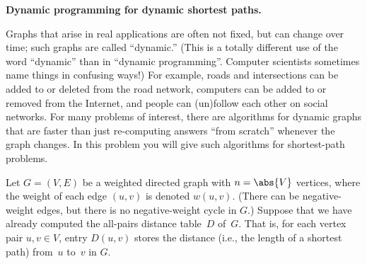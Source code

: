 \documentclass[11pt,addpoints]{exam}
\begin{document}
\begin{questions}

  
  \question \textbf{Dynamic programming for dynamic shortest paths.} \nopagebreak
             
  Graphs that arise in real applications are often not fixed, but can change over time; such graphs are called ``dynamic.''
  (This is a totally different use of the word ``dynamic'' than in ``dynamic programming''.
  Computer scientists sometimes name things in confusing ways!)
  For example, roads and intersections can be added to or deleted from the road network, computers can be added to or removed from the Internet, and people can (un)follow each other on social networks.
  For many problems of interest, there are algorithms for dynamic graphs that are faster than just re-computing answers ``from scratch'' whenever the graph changes.
  In this problem you will give such algorithms for shortest-path problems.

  \vspace{1.0cm}
  
  Let $G=(V, E)$ be a weighted directed graph with $n=\abs{V}$ vertices, where the weight of each edge $(u,v)$ is denoted $w(u,v)$.
  (There can be negative-weight edges, but there is no negative-weight cycle in $G$.)
  Suppose that we have already computed the all-pairs distance table~$D$ of~$G$.
  That is, for each vertex pair $u,v \in V$, entry $D(u,v)$ stores the distance (i.e., the length of a shortest path) from~$u$ to~$v$ in $G$.


\end{questions}
\end{document}
